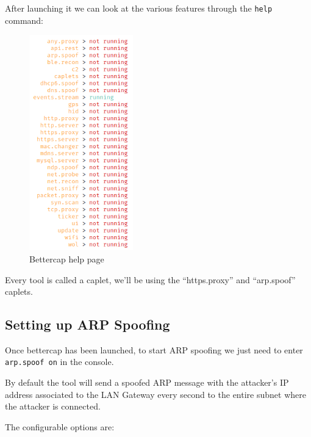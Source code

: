 \documentclass[status=normal,cover=tesi,language=en]{gmeepd}
\begin{document}
After launching it we can look at the various features through the \verb|help| command:

\begin{figure}[h!]
 \centering
 \includegraphics[width=4.5cm]{img/bettercap_help.png}
 \caption{Bettercap help page}
 \label{fig: bettercap help}
\end{figure}

Every tool is called a caplet, we'll be using the ``https.proxy'' and ``arp.spoof'' caplets.

\pagebreak

\subsection{Setting up ARP Spoofing}

Once bettercap has been launched, to start ARP spoofing we just need to enter \verb|arp.spoof on| in the console.

By default the tool will send a spoofed ARP message with the attacker's IP address associated to the LAN Gateway every second to the entire subnet where the attacker is connected.

The configurable options are\cite{arp-poof-source-code}:
\end{document}
